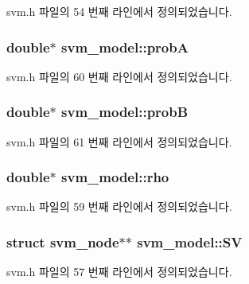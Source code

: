 svm.\+h 파일의 54 번째 라인에서 정의되었습니다.

\hypertarget{structsvm__model_adf5f28fcdd3ca1c5b23c1f6167710a04}{
\subsubsection[{prob\+A}]{\setlength{\rightskip}{0pt plus 5cm}double$\ast$ svm\+\_\+model\+::prob\+A}}\label{structsvm__model_adf5f28fcdd3ca1c5b23c1f6167710a04}


svm.\+h 파일의 60 번째 라인에서 정의되었습니다.

\hypertarget{structsvm__model_a73ba8feaaf3c2c38c6bb81f7bcb5809e}{
\subsubsection[{prob\+B}]{\setlength{\rightskip}{0pt plus 5cm}double$\ast$ svm\+\_\+model\+::prob\+B}}\label{structsvm__model_a73ba8feaaf3c2c38c6bb81f7bcb5809e}


svm.\+h 파일의 61 번째 라인에서 정의되었습니다.

\hypertarget{structsvm__model_a16e4dea1508f93ece4384ec35c991887}{
\subsubsection[{rho}]{\setlength{\rightskip}{0pt plus 5cm}double$\ast$ svm\+\_\+model\+::rho}}\label{structsvm__model_a16e4dea1508f93ece4384ec35c991887}


svm.\+h 파일의 59 번째 라인에서 정의되었습니다.

\hypertarget{structsvm__model_a96da6fe173a7150dae95bf55d5539e45}{
\subsubsection[{S\+V}]{\setlength{\rightskip}{0pt plus 5cm}struct {\bf svm\+\_\+node}$\ast$$\ast$ svm\+\_\+model\+::\+S\+V}}\label{structsvm__model_a96da6fe173a7150dae95bf55d5539e45}


svm.\+h 파일의 57 번째 라인에서 정의되었습니다.

